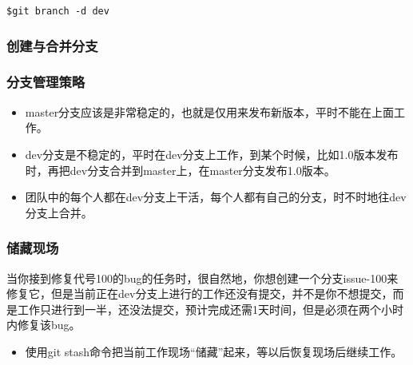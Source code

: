 \documentclass[notheorems,mathserif,table,compress]{beamer}  %
\newcommand\zhushadow[2][purple]{\hskip5pt\shadowbox{\color{#1}\small\kai #2\vspace{3mm}}}
\begin{document}
  \begin{lrbox}{\mysaveboxFive}
  \verb|$git branch -d dev|
  \end{lrbox}

\begin{frame}[fragile]
  \frametitle{创建与合并分支}




\end{frame}


\begin{frame}
  \frametitle{分支管理策略}
  \begin{itemize}
  \item master分支应该是非常稳定的，也就是仅用来发布新版本，平时不能在上面工作。
  \item dev分支是不稳定的，平时在dev分支上工作，到某个时候，比如1.0版本发布时，再把dev分支合并到master上，在master分支发布1.0版本。
  \item 团队中的每个人都在dev分支上干活，每个人都有自己的分支，时不时地往dev分支上合并。
  \end{itemize}
\end{frame}


\begin{frame}
  \frametitle{储藏现场}
  \zhushadow{应用场景} 当你接到修复代号100的bug的任务时，很自然地，你想创建一个分支issue-100来修复它，但是当前正在dev分支上进行的工作还没有提交，并不是你不想提交，而是工作只进行到一半，还没法提交，预计完成还需1天时间，但是必须在两个小时内修复该bug。
  
  \begin{itemize}
  \item 使用git stash命令把当前工作现场“储藏”起来，等以后恢复现场后继续工作。
  
  \end{itemize}
\end{frame}
\end{document}
